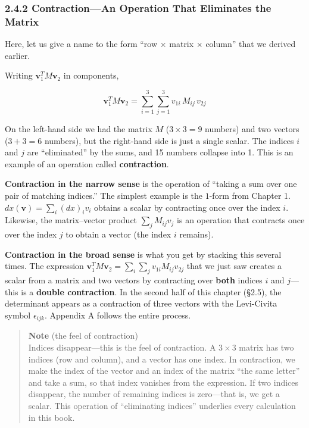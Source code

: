 \hypertarget{contractionan-operation-that-eliminates-the-matrix}{%
\subsubsection{2.4.2 Contraction---An Operation That Eliminates the
Matrix}\label{contractionan-operation-that-eliminates-the-matrix}}

Here, let us give a name to the form ``row \(\times\) matrix \(\times\)
column'' that we derived earlier.

Writing \(\mathbf{v}_1^T M \mathbf{v}_2\) in components,

\[
\mathbf{v}_1^T M \mathbf{v}_2 = \sum_{i=1}^3 \sum_{j=1}^3 v_{1i}\, M_{ij}\, v_{2j}
\]

On the left-hand side we had the matrix \(M\) (\(3 \times 3 = 9\)
numbers) and two vectors (\(3+3=6\) numbers), but the right-hand side is
just a single scalar. The indices \(i\) and \(j\) are ``eliminated'' by
the sums, and 15 numbers collapse into 1. This is an example of an
operation called \textbf{contraction}.

\textbf{Contraction in the narrow sense} is the operation of ``taking a
sum over one pair of matching indices.'' The simplest example is the
\(1\)-form from Chapter 1. \(dx(\mathbf{v}) = \sum_i (dx)_i v_i\)
obtains a scalar by contracting once over the index \(i\). Likewise, the
matrix--vector product \(\sum_j M_{ij} v_j\) is an operation that
contracts once over the index \(j\) to obtain a vector (the index \(i\)
remains).

\textbf{Contraction in the broad sense} is what you get by stacking this
several times. The expression
\(\mathbf{v}_1^T M \mathbf{v}_2 = \sum_i \sum_j v_{1i} M_{ij} v_{2j}\)
that we just saw creates a scalar from a matrix and two vectors by
contracting over \textbf{both} indices \(i\) and \(j\)---this is a
\textbf{double contraction}. In the second half of this chapter (§2.5),
the determinant appears as a contraction of three vectors with the
Levi-Civita symbol \(\epsilon_{ijk}\). Appendix A follows the entire
process.

\begin{quote}
\textbf{Note} (the feel of contraction)\\
Indices disappear---this is the feel of contraction. A \(3 \times 3\)
matrix has two indices (row and column), and a vector has one index. In
contraction, we make the index of the vector and an index of the matrix
``the same letter'' and take a sum, so that index vanishes from the
expression. If two indices disappear, the number of remaining indices is
zero---that is, we get a scalar. This operation of ``eliminating
indices'' underlies every calculation in this book.
\end{quote}

